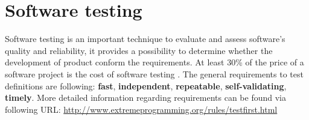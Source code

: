\chapter{Software testing}
\label{chap:testing}
Software testing is an important technique to evaluate and assess software's quality and reliability, it provides a possibility to determine whether the development of product conform the requirements. At least 30\% of the price of a software project is the cost of software testing \cite{Lecture2}. 
The general requirements to test definitions are following: \textbf{fast}, \textbf{independent}, \textbf{repeatable}, \textbf{self-validating}, \textbf{timely}.
More detailed information regarding requirements can be found via following URL: \url{http://www.extremeprogramming.org/rules/testfirst.html}
